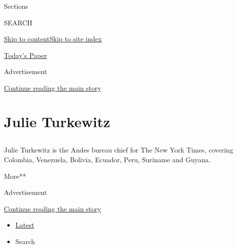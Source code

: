 Sections

SEARCH

\protect\hyperlink{site-content}{Skip to
content}\protect\hyperlink{site-index}{Skip to site index}

\href{https://myaccount.nytimes.com/auth/login?response_type=cookie\&client_id=vi}{}

\href{https://www.nytimes.com/section/todayspaper}{Today's Paper}

Advertisement

\protect\hyperlink{after-top}{Continue reading the main story}

\hypertarget{julie-turkewitz}{%
\section{Julie Turkewitz}\label{julie-turkewitz}}

\subsection{}

Julie Turkewitz is the Andes bureau chief for The New York Times,
covering Colombia, Venezuela, Bolivia, Ecuador, Peru, Suriname and
Guyana.

More**

Advertisement

\protect\hyperlink{after-mid1}{Continue reading the main story}

\begin{itemize}
\tightlist
\item
  \protect\hyperlink{stream-panel}{Latest}
\item
  Search
\end{itemize}

